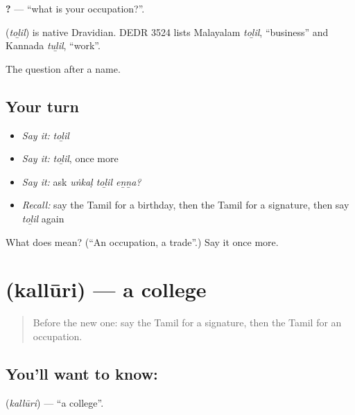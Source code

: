\textbf{  ?} — \textquotedblleft{}what is your occupation?\textquotedblright{}.

\begin{cousinweb}
\textbf{} (\emph{toḻil}) is native Dravidian. DEDR 3524 lists Malayalam \emph{toḻil}, \textquotedblleft{}business\textquotedblright{} and Kannada \emph{tuḻil}, \textquotedblleft{}work\textquotedblright{}.
\end{cousinweb}

\begin{grammarlens}[title={What you've built}]
The question after a name.
\end{grammarlens}

\subsection*{Your turn}
\begin{itemize}
\raggedright
  \item \emph{Say it:} \emph{toḻil}
  \item \emph{Say it:} \emph{toḻil}, once more
  \item \emph{Say it:} ask \emph{uṅkaḷ toḻil eṉṉa?}
  \item \emph{Recall:} say the Tamil for a birthday, then the Tamil for a signature, then say \emph{toḻil} again
\end{itemize}

\begin{tcolorbox}[breakable,colback=teal!4,colframe=teal!35!black,title={Before you move on}]
What does  mean? (\textquotedblleft{}An occupation, a trade\textquotedblright{}.) Say it once more.
\end{tcolorbox}
\section[\texorpdfstring{\ta{கல்லூரி} (kallūri)}{கல்லூரி (kallūri)}]{ (kallūri) — a college}

\label{lesson:TA-C105-college}



\begin{quote}
Before the new one: say the Tamil for a signature, then the Tamil for an occupation.
\end{quote}

\subsection*{You'll want to know: }
\textbf{} (\emph{kallūri}) — \textquotedblleft{}a college\textquotedblright{}.

